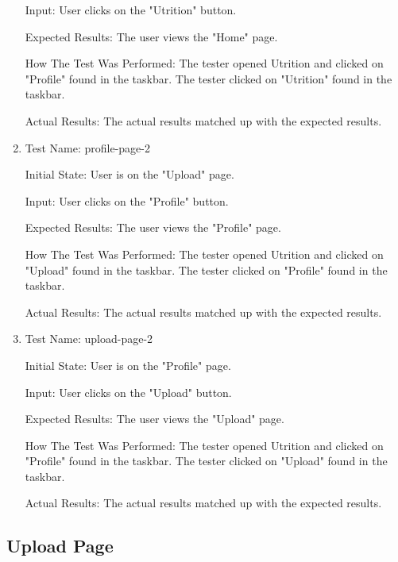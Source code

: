 \documentclass[12pt, titlepage]{article}
\begin{document}
\begin{enumerate}
	Input: User clicks on the "Utrition" button.
	
	Expected Results: The user views the "Home" page.
	
	How The Test Was Performed: The tester opened Utrition and clicked on "Profile" found in the taskbar. The tester clicked on "Utrition" found in the taskbar.
	
	Actual Results: The actual results matched up with the expected results.
	
	\item{Test Name: profile-page-2}
	
	Initial State: User is on the "Upload" page.
	
	Input: User clicks on the "Profile" button.
	
	Expected Results: The user views the "Profile" page.
	
	How The Test Was Performed: The tester opened Utrition and clicked on "Upload" found in the taskbar. The tester clicked on "Profile" found in the taskbar.
	
	Actual Results: The actual results matched up with the expected results.
	
	\item{Test Name: upload-page-2}
	
	Initial State: User is on the "Profile" page.
	
	Input: User clicks on the "Upload" button.
	
	Expected Results: The user views the "Upload" page.
	
	How The Test Was Performed: The tester opened Utrition and clicked on "Profile" found in the taskbar. The tester clicked on "Upload" found in the taskbar.
	
	Actual Results: The actual results matched up with the expected results.
	\end{enumerate}

	\subsection{Upload Page}
\end{document}

